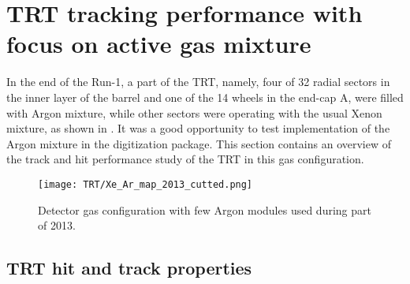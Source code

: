 \section{TRT tracking performance with focus on active gas mixture}
\label{sec:trt_tracking_perf}

In the end of the Run-1, a part of the TRT, namely,
four of 32 radial sectors in the inner layer of the barrel and one of the 14 wheels in the end-cap A, were filled with Argon mixture, while other sectors were operating 
with the usual Xenon mixture, as shown in .
It was a good opportunity to test implementation of the Argon mixture in the digitization package.
This section contains an overview of the track and hit performance study of the TRT in this gas configuration.

\begin{figure}
\begin{center}
 \texttt{[image: TRT/Xe\_Ar\_map\_2013\_cutted.png]}
\caption{Detector gas configuration with few Argon modules used during part of 2013.}
\label{fig:argonModulesIn2013}
\end{center}
\end{figure}

\subsection{TRT hit and track properties}

